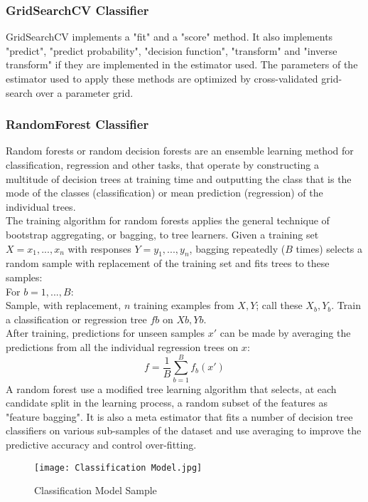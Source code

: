 \documentclass[sigconf]{acmart}
\begin{document}
\subsubsection{GridSearchCV Classifier}
GridSearchCV implements a "fit" and a "score" method. It also implements "predict", "predict probability", "decision function", "transform" and "inverse transform" if they are implemented in the estimator used. The parameters of the estimator used to apply these methods are optimized by cross-validated grid-search over a parameter grid.
\subsubsection{RandomForest Classifier}
Random forests or random decision forests are an ensemble learning method for classification, regression and other tasks, that operate by constructing a multitude of decision trees at training time and outputting the class that is the mode of the classes (classification) or mean prediction (regression) of the individual trees.\\
The training algorithm for random forests applies the general technique of bootstrap aggregating, or bagging, to tree learners. Given a training set $X = x_1, ..., x_n$ with responses $Y = y_1, ..., y_n$, bagging repeatedly ($B$ times) selects a random sample with replacement of the training set and fits trees to these samples:\\
\indent For $b = 1, ..., B$:\\
\indent Sample, with replacement, $n$ training examples from $X, Y$; call these $X_b, Y_b$.
\indent Train a classification or regression tree $fb$ on $Xb, Yb$.\\
\indent After training, predictions for unseen samples $x'$ can be made by averaging the predictions from all the individual regression trees on $x$:
$$f = \frac{1}{B}\sum^B_{b=1}f_b(x')$$
\indent A random forest use a modified tree learning algorithm that selects, at each candidate split in the learning process, a random subset of the features as "feature bagging". It is also a meta estimator that fits a number of decision tree classifiers on various sub-samples of the dataset and use averaging to improve the predictive accuracy and control over-fitting. 
\begin{figure}[htbp]

\centering
\texttt{[image: Classification Model.jpg]}
\caption{Classification Model Sample} \label{fig: Classification Model Sample}
\end{figure}
\end{document}
